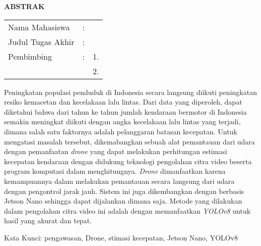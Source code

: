 \begin{center}
  \large\textbf{ABSTRAK}
\end{center}


\vspace{2ex}

\begingroup
\setlength{\tabcolsep}{0pt}

\noindent
\begin{tabularx}{\textwidth}{l >{\centering}m{2em} X}
  Nama Mahasiswa    & : & \name{}         \\

  Judul Tugas Akhir & : & \tatitle{}      \\

  Pembimbing        & : & 1. \advisor{}   \\
                    &   & 2. \coadvisor{} \\
\end{tabularx} 
\endgroup

Peningkatan populasi penduduk di Indonesia secara langsung diikuti peningkatan resiko kemacetan dan kecelakaan lalu lintas. Dari data yang diperoleh, dapat diketahui bahwa dari tahun ke tahun jumlah kendaraan bermotor di Indonesia semakin meningkat diikuti dengan angka kecelakaan lalu lintas yang terjadi, dimana salah satu faktornya adalah pelanggaran batasan kecepatan. Untuk mengatasi masalah tersebut, dikemabangkan sebuah alat pemantauan dari udara dengan pemanfaatan \emph{drone} yang dapat melakukan perhitungan estimasi kecepatan kendaraan dengan didukung teknologi pengolahan citra video beserta program komputasi dalam menghitungnya. \emph{Drone} dimanfaatkan karena kemampuannya dalam melakukan pemantauan secara langsung dari udara dengan pengontrol jarak jauh. Sistem ini juga dikembangkan dengan berbasis Jetson Nano sehingga dapat dijalankan dimana saja. Metode yang dilakukan dalam pengolahan citra video ini adalah dengan memanfaatkan \emph{YOLOv8} untuk hasil yang akurat dan tepat.

Kata Kunci: pengawasan, Drone, stimasi kecepatan, Jetson Nano, YOLOv8
